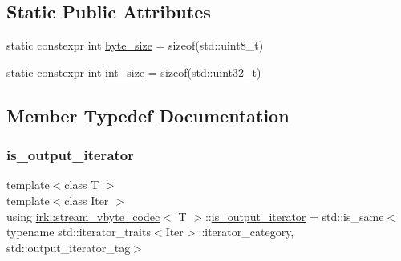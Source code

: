 \subsection*{Static Public Attributes}
\begin{DoxyCompactItemize}
\item 
static constexpr int \mbox{\hyperlink{structirk_1_1stream__vbyte__codec_a3a933afe13dc7b4545eb1ea4987200e5}{byte\+\_\+size}} = sizeof(std\+::uint8\+\_\+t)
\item 
static constexpr int \mbox{\hyperlink{structirk_1_1stream__vbyte__codec_a967cdfdae60448bef37a7591e13d456e}{int\+\_\+size}} = sizeof(std\+::uint32\+\_\+t)
\end{DoxyCompactItemize}


\subsection{Member Typedef Documentation}
\mbox{\label{structirk_1_1stream__vbyte__codec_a7f9d7916a78880d1c4b3798e8b161eb2}} 
\subsubsection{\texorpdfstring{is\+\_\+output\+\_\+iterator}{is\_output\_iterator}}
{\footnotesize\ttfamily template$<$class T $>$ \\
template$<$class Iter $>$ \\
using \mbox{\hyperlink{structirk_1_1stream__vbyte__codec}{irk\+::stream\+\_\+vbyte\+\_\+codec}}$<$ T $>$\+::\mbox{\hyperlink{structirk_1_1stream__vbyte__codec_a7f9d7916a78880d1c4b3798e8b161eb2}{is\+\_\+output\+\_\+iterator}} =  std\+::is\+\_\+same$<$typename std\+::iterator\+\_\+traits$<$Iter$>$\+::iterator\+\_\+category, std\+::output\+\_\+iterator\+\_\+tag$>$}

\mbox{\label{structirk_1_1stream__vbyte__codec_a770dc53873c94b550afb65a87b33fb67}} 
